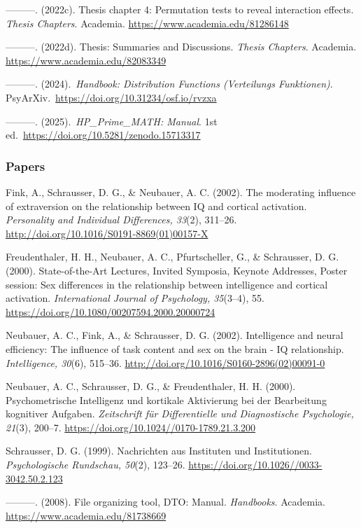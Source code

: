 \documentclass[
]{article}
\begin{document}
---------. (2022c). Thesis chapter 4: Permutation tests to reveal
interaction effects. \emph{Thesis Chapters}. Academia.
\url{https://www.academia.edu/81286148}

---------. (2022d). Thesis: Summaries and Discussions. \emph{Thesis
Chapters}. Academia. \url{https://www.academia.edu/82083349}

---------. (2024).~\emph{Handbook: Distribution Functions (Verteilungs
Funktionen)}. PsyArXiv.~\url{https://doi.org/10.31234/osf.io/rvzxa}

---------. (2025).~\emph{HP\_Prime\_MATH: Manual}. 1st
ed.~\url{https://doi.org/10.5281/zenodo.15713317}

\hypertarget{papers}{%
\subsubsection{Papers}\label{papers}}

Fink, A., Schrausser, D. G., \& Neubauer, A. C. (2002). The moderating
influence of extraversion on the relationship between IQ and cortical
activation. \emph{Personality and Individual Differences, 33}(2),
311--26. \url{http://doi.org/10.1016/S0191-8869(01)00157-X}

Freudenthaler, H. H., Neubauer, A. C., Pfurtscheller, G., \& Schrausser,
D. G. (2000). State-of-the-Art Lectures, Invited Symposia, Keynote
Addresses, Poster session: Sex differences in the relationship between
intelligence and cortical activation. \emph{International Journal of
Psychology, 35}(3--4), 55.
\url{https://doi.org/10.1080/00207594.2000.20000724}

Neubauer, A. C., Fink, A., \& Schrausser, D. G. (2002). Intelligence and
neural efficiency: The influence of task content and sex on the brain -
IQ relationship. \emph{Intelligence, 30}(6), 515--36.
\url{http://doi.org/10.1016/S0160-2896(02)00091-0}

Neubauer, A. C., Schrausser, D. G., \& Freudenthaler, H. H. (2000).
Psychometrische Intelligenz und kortikale Aktivierung bei der
Bearbeitung kognitiver Aufgaben. \emph{Zeitschrift für Differentielle
und Diagnostische Psychologie, 21}(3), 200--7.
\url{https://doi.org/10.1024//0170-1789.21.3.200}

Schrausser, D. G. (1999). Nachrichten aus Instituten und Institutionen.
\emph{Psychologische Rundschau, 50}(2), 123--26.
\url{https://doi.org/10.1026//0033-3042.50.2.123}

---------. (2008). File organizing tool, DTO: Manual. \emph{Handbooks}.
Academia. \url{https://www.academia.edu/81738669}
\end{document}
